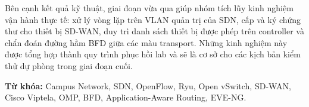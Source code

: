 Bên cạnh kết quả kỹ thuật, giai đoạn vừa qua giúp nhóm tích lũy kinh nghiệm vận hành thực tế: xử lý vòng lặp trên VLAN quản trị của SDN, cấp và ký chứng thư cho thiết bị SD-WAN, duy trì danh sách thiết bị được phép trên controller và chẩn đoán đường hầm BFD giữa các màu transport. Những kinh nghiệm này được tổng hợp thành quy trình phục hồi lab và sẽ là cơ sở cho các kịch bản kiểm thử dự phòng trong giai đoạn cuối.

\textbf{Từ khóa:} Campus Network, SDN, OpenFlow, Ryu, Open vSwitch, SD-WAN, Cisco Viptela, OMP, BFD, Application-Aware Routing, EVE-NG.

\newpage
